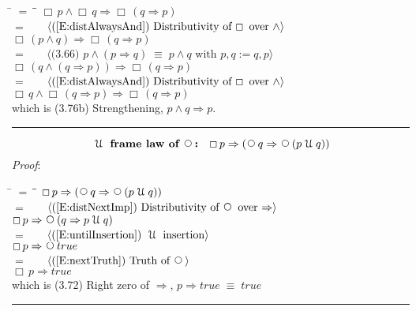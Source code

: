 \documentclass[12pt, fleqn, leqno]{article}
\newcommand{\lgap}{2pt}                             %
\newcommand{\mymathindent}{24pt}                    %
\newcommand{\equivs}{\ensuremath{\;\equiv\;}}       %
\newcommand{\impl}{\ensuremath{\Rightarrow}}        %
\newcommand{\Until}{\;\mathcal{U}\;}
\newcommand{\Next}{\;\,\text{\raisebox{3.5pt}{\circle{6}}}}
\newcommand{\Always}{\Box\,}
\newcommand{\myqed}{\rule[-.23ex]{1.2ex}{2.0ex}}
\newcommand{\myqedtab}{\hspace{384pt}}              %
\newcommand{\Gll} {\langle}                         %
\newcommand{\Ggg} {\rangle}                         %
\newcommand{\Hint}[1]     {\ \ \ $\Gll              \mbox{#1} \Ggg$ }   %
\begin{document}
\begin{tabbing}
\hspace{\mymathindent} \= $= \;$ \= \myqedtab \= \kill
  \> \>   $\Always p \land \Always q \impl \Always (q \impl p)$\\[\lgap]
   \> $=$  \>  \Hint{(\ref{E:distAlwaysAnd}) Distributivity of $\Always$ over $\land$}\\[\lgap]
  \> \>   $\Always (p \land q) \impl \Always (q \impl p)$\\[\lgap]
   \> $=$  \>  \Hint{(3.66) $p\land (p\impl q) \equivs p\land q$ with $p, q := q , p$}\\[\lgap]
  \> \>   $\Always (q \land (q \impl p)) \impl \Always (q \impl p)$\\[\lgap]
    \> $=$  \>  \Hint{(\ref{E:distAlwaysAnd}) Distributivity of $\Always$ over $\land$}\\[\lgap]
  \> \>   $\Always q \land \Always (q \impl p) \impl \Always (q \impl p)$\\[\lgap]
   \> which is (3.76b) Strengthening, $p\land q \impl p$. \quad \myqed
\end{tabbing}

\begin{equation}\label{E:untilframelawnext}
\textbf{$\Until$ frame law of $\Next$:}\quad \Always p \impl (\Next q \impl \Next (p \Until q))
\end{equation}
\emph{Proof}:
\begin{tabbing}
\hspace{\mymathindent} \= $= \;$ \= \myqedtab \= \kill
	\> \>   $\Always p \impl (\Next q \impl \Next (p \Until q))$\\[\lgap]
	\> $=$  \>  \Hint{(\ref{E:distNextImp}) Distributivity of $\Next$ over $\impl$}\\[\lgap]
	\> \>   $\Always p \impl \Next (q \impl p \Until q)$\\[\lgap]
	\> $=$  \>  \Hint{(\ref{E:untilInsertion}) $\Until$ insertion}\\[\lgap]
	\> \>   $\Always p \impl \Next true$\\[\lgap]
	\> $=$  \>  \Hint{(\ref{E:nextTruth}) Truth of $\Next$}\\[\lgap]
	\> \>   $\Always p \impl true$\\[\lgap]
	\> which is (3.72) Right zero of $\impl$, $p\impl true \equivs true$ \quad \myqed
\end{tabbing}
\end{document}
